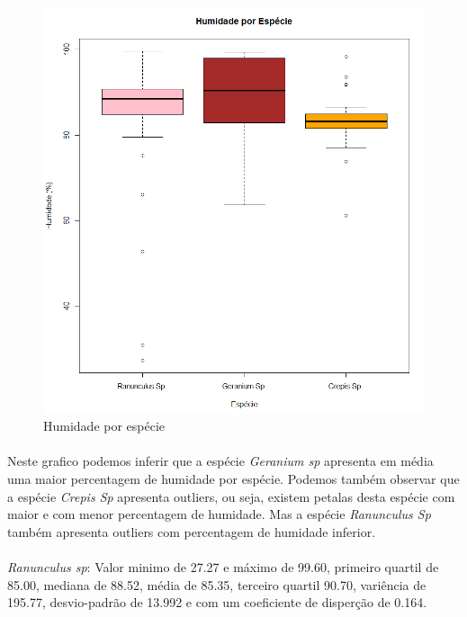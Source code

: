 \documentclass{article}
\begin{document}
\begin{figure}[h]
       \centering %
        \includegraphics[scale=0.6]{Analise humidade por especie.png}
       \caption{Humidade por espécie}
       \label{fig:logo}
    \end{figure}
    
\paragraph{} Neste grafico podemos inferir que a espécie \textit{Geranium sp} apresenta em média uma maior percentagem de humidade por espécie. Podemos também observar que a espécie \textit{Crepis Sp} apresenta outliers, ou seja, existem petalas desta espécie com maior e com menor percentagem de humidade. Mas a espécie \textit{Ranunculus Sp} também apresenta outliers com percentagem de humidade inferior.

\paragraph{}\textit{Ranunculus sp}: Valor minimo de 27.27 e máximo de 99.60, primeiro quartil de 85.00, mediana de 88.52, média de 85.35,  terceiro quartil 90.70, variência de 195.77, desvio-padrão de 13.992 e com um coeficiente de disperção de 0.164.
\end{document}
